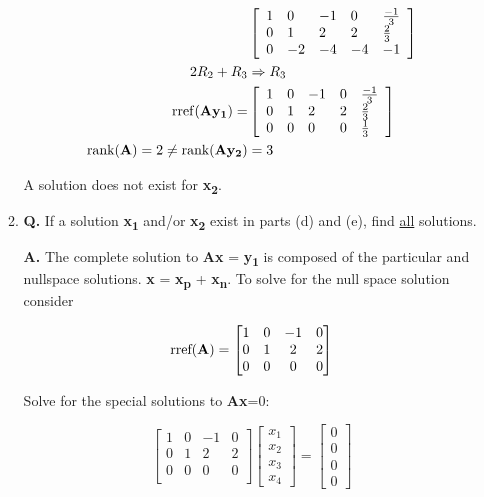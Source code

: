 \documentclass[main.tex]{subfiles}
\begin{document}
\begin{enumerate}
\begin{enumerate}
\begin{equation}
\begin{aligned}
        & \left[\begin{array}{lllll}
        1 & 0 & -1 & 0 & \frac{-1}{3} \\
        0 & 1 & 2 & 2 & \frac{2}{3} \\
        0 & -2 & -4 & -4 & -1
        \end{array}\right]\\
        2R_2 + R_3 & \Rightarrow R_3\\
        \operatorname{rref}(\textbf{A} \textbf{y\textsubscript{1}}) = & \left[\begin{array}{lllll}
        1 & 0 & -1 & 0 & \frac{-1}{3} \\
        0 & 1 & 2 & 2 & \frac{2}{3} \\
        0 & 0 & 0 & 0 & \frac{1}{3}
        \end{array}\right]\\
        \text{rank}(\textbf{A}) = 2 \neq \text{rank}(\textbf{A} \textbf{y\textsubscript{2}}) & = 3
    \end{aligned}
    \end{equation}

    A solution does not exist for \textbf{x\textsubscript{2}}.
    
    \item \textbf{Q.} If a solution \textbf{x\textsubscript{1}} and/or \textbf{x\textsubscript{2}} exist in parts (d) and (e), find \underline{all} solutions.

    \textbf{A.} The complete solution to \textbf{A}\textbf{x} = \textbf{y\textsubscript{1}} is composed of the particular and nullspace solutions. \textbf{x} = \textbf{x\textsubscript{p}} + \textbf{x\textsubscript{n}}. To solve for the null space solution consider 

    $$
    \text{rref(\textbf{A})} = \begin{bmatrix} 
    1 & 0 & -1 & 0 \\
    0 & 1 & 2 & 2 \\
    0 & 0 & 0 & 0 \\
    \end{bmatrix}
    $$

    Solve for the special solutions to \textbf{A}\textbf{x}=0:

    $$
    \left[\begin{array}{llll}
    1 & 0 & -1 & 0 \\
    0 & 1 & 2 & 2 \\
    0 & 0 & 0 & 0 \\
    \end{array}\right]\left[\begin{array}{l}
    x_1 \\
    x_2 \\
    x_3 \\
    x_4
    \end{array}\right]=\left[\begin{array}{l}
    0 \\
    0 \\
    0 \\
    0
    \end{array}\right]
    $$


\end{enumerate}
\end{enumerate}
\end{document}
